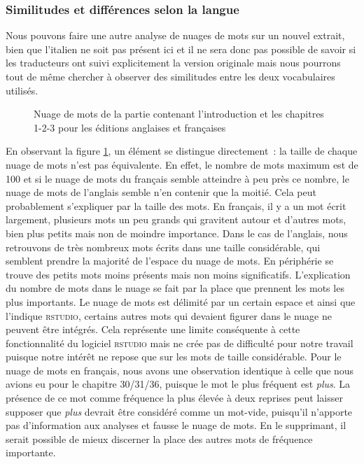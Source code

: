 \subsubsection{Similitudes et différences selon la langue}
Nous pouvons faire une autre analyse de nuages de mots sur un nouvel extrait, bien que l'italien ne soit pas présent ici et il ne sera donc pas possible de savoir si les traducteurs ont suivi explicitement la version originale mais nous pourrons tout de même chercher à observer des similitudes entre les deux vocabulaires utilisés.
\begin{figure}[t]
    \centering
    \caption{Nuage de mots de la partie contenant l'introduction et les chapitres 1-2-3 pour les éditions anglaises et françaises}
    \label{fig:word_cloud_intro}
\end{figure}

En observant la figure \ref{fig:word_cloud_intro}, un élément se distingue directement~: la taille de chaque nuage de mots n'est pas équivalente. En effet, le nombre de mots maximum est de 100 et si le nuage de mots du français semble atteindre à peu près ce nombre, le nuage de mots de l'anglais semble n'en contenir que la moitié. Cela peut probablement s'expliquer par la taille des mots. En français, il y a un mot écrit largement, plusieurs mots un peu grands qui gravitent autour et d'autres mots, bien plus petits mais non de moindre importance. Dans le cas de l'anglais, nous retrouvons de très nombreux mots écrits dans une taille considérable, qui semblent prendre la majorité de l'espace du nuage de mots. En périphérie se trouve des petits mots moins présents mais non moins significatifs. L'explication du nombre de mots dans le nuage se fait par la place que prennent les mots les plus importants. Le nuage de mots est délimité par un certain espace et ainsi que l'indique \textsc{rstudio}, certains autres mots qui devaient figurer dans le nuage ne peuvent être intégrés. Cela représente une limite conséquente à cette fonctionnalité du logiciel \textsc{rstudio} mais ne crée pas de difficulté pour notre travail puisque notre intérêt ne repose que sur les mots de taille considérable. Pour le nuage de mots en français, nous avons une observation identique à celle que nous avions eu pour le chapitre 30/31/36, puisque le mot le plus fréquent est \textit{plus}. La présence de ce mot comme fréquence la plus élevée à deux reprises peut laisser supposer que \textit{plus} devrait être considéré comme un mot-vide, puisqu'il n'apporte pas d'information aux analyses et fausse le nuage de mots. En le supprimant, il serait possible de mieux discerner la place des autres mots de fréquence importante.


